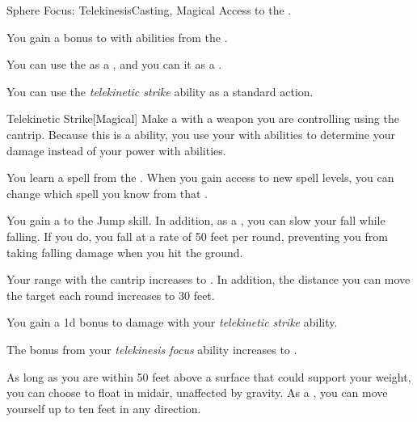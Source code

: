     \begin{feat}{Sphere Focus: Telekinesis}{Casting, Magical}
        \featpre Access to the  .

         You gain a  bonus to  with abilities from the  .

         You can use the   as a , and you can  it as a .

         You can use the \textit{telekinetic strike} ability as a standard action.
        \begin{freeability}{Telekinetic Strike}[Magical]
            Make a  with a weapon you are controlling using the  cantrip.
            Because this is a  ability, you use your  with  abilities to determine your damage instead of your power with  abilities.
        \end{freeability}

         You learn a spell from the  .
        When you gain access to new spell levels, you can change which spell you know from that .

         You gain a   to the Jump skill.
        In addition, as a , you can slow your fall while falling.
        If you do, you fall at a rate of 50 feet per round, preventing you from taking falling damage when you hit the ground.

         Your range with the  cantrip increases to \rngmed.
        In addition, the distance you can move the target each round increases to 30 feet.

         You gain a \plus1d bonus to damage with your \textit{telekinetic strike} ability.

         The bonus from your \textit{telekinesis focus} ability increases to .

         As long as you are within 50 feet above a surface that could support your weight, you can choose to float in midair, unaffected by gravity.
        As a , you can move yourself up to ten feet in any direction.
    \end{feat}

